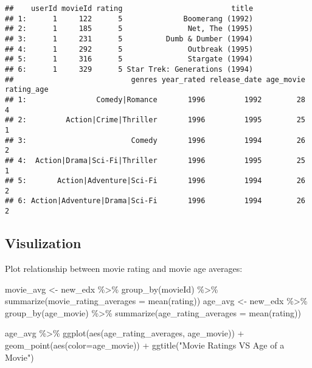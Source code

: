 \documentclass[
]{article}
\newenvironment{Shaded}{\begin{snugshade}}{\end{snugshade}}
\newcommand{\AttributeTok}[1]{\textcolor[rgb]{0.77,0.63,0.00}{#1}}
\newcommand{\FunctionTok}[1]{\textcolor[rgb]{0.00,0.00,0.00}{#1}}
\newcommand{\NormalTok}[1]{#1}
\newcommand{\OtherTok}[1]{\textcolor[rgb]{0.56,0.35,0.01}{#1}}
\newcommand{\SpecialCharTok}[1]{\textcolor[rgb]{0.00,0.00,0.00}{#1}}
\newcommand{\StringTok}[1]{\textcolor[rgb]{0.31,0.60,0.02}{#1}}
\begin{document}
\begin{verbatim}
##    userId movieId rating                         title
## 1:      1     122      5              Boomerang (1992)
## 2:      1     185      5               Net, The (1995)
## 3:      1     231      5          Dumb & Dumber (1994)
## 4:      1     292      5               Outbreak (1995)
## 5:      1     316      5               Stargate (1994)
## 6:      1     329      5 Star Trek: Generations (1994)
##                           genres year_rated release_date age_movie rating_age
## 1:                Comedy|Romance       1996         1992        28          4
## 2:         Action|Crime|Thriller       1996         1995        25          1
## 3:                        Comedy       1996         1994        26          2
## 4:  Action|Drama|Sci-Fi|Thriller       1996         1995        25          1
## 5:       Action|Adventure|Sci-Fi       1996         1994        26          2
## 6: Action|Adventure|Drama|Sci-Fi       1996         1994        26          2
\end{verbatim}

\hypertarget{visulization}{%
\subsection{Visulization}\label{visulization}}

Plot relationship between movie rating and movie age averages:

\begin{Shaded}
\begin{Highlighting}[]
\NormalTok{movie\_avg }\OtherTok{\textless{}{-}}\NormalTok{ new\_edx }\SpecialCharTok{\%\textgreater{}\%} \FunctionTok{group\_by}\NormalTok{(movieId) }\SpecialCharTok{\%\textgreater{}\%} \FunctionTok{summarize}\NormalTok{(}\AttributeTok{movie\_rating\_averages =} \FunctionTok{mean}\NormalTok{(rating))}
\NormalTok{age\_avg }\OtherTok{\textless{}{-}}\NormalTok{ new\_edx }\SpecialCharTok{\%\textgreater{}\%} \FunctionTok{group\_by}\NormalTok{(age\_movie) }\SpecialCharTok{\%\textgreater{}\%} \FunctionTok{summarize}\NormalTok{(}\AttributeTok{age\_rating\_averages =} \FunctionTok{mean}\NormalTok{(rating))}
\end{Highlighting}
\end{Shaded}

\begin{Shaded}
\begin{Highlighting}[]
\NormalTok{age\_avg }\SpecialCharTok{\%\textgreater{}\%}
  \FunctionTok{ggplot}\NormalTok{(}\FunctionTok{aes}\NormalTok{(age\_rating\_averages, age\_movie)) }\SpecialCharTok{+}
  \FunctionTok{geom\_point}\NormalTok{(}\FunctionTok{aes}\NormalTok{(}\AttributeTok{color=}\NormalTok{age\_movie)) }\SpecialCharTok{+}
  \FunctionTok{ggtitle}\NormalTok{(}\StringTok{"Movie Ratings VS Age of a Movie"}\NormalTok{)}
\end{Highlighting}
\end{Shaded}
\end{document}
